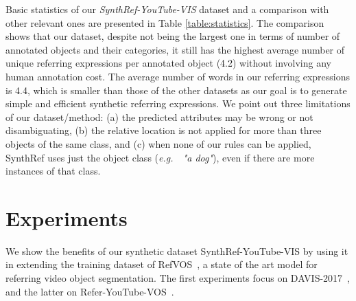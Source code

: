 \documentclass[11pt]{article}
\newcommand{\eg}{\textit{e.g.~}}
\begin{document}
Basic statistics of our \textit{SynthRef-YouTube-VIS} dataset and a comparison with other relevant ones are presented in Table \ref{table:statistics}. 
The comparison shows that our dataset, despite not being the largest one in terms of number of annotated objects and their categories, it still has the highest average number of unique referring expressions per annotated object (4.2) without involving any human annotation cost. The average number of words in our referring expressions is 4.4, which is smaller than 
those of the other datasets as our goal is to generate simple and efficient synthetic referring expressions.
We point out three limitations of our dataset/method: (a) the predicted attributes may be wrong or not disambiguating, (b) the relative location is not applied for more than three objects of the same class, and (c) when none of our rules can be applied, SynthRef uses just the object class (\eg ~\textit{"a dog"}), even if there are more instances of that class.
















 \section{Experiments}

\label{sec:experiments}



We show the benefits of our synthetic dataset SynthRef-YouTube-VIS by using it in extending the training dataset of RefVOS~\citep{bellver2020refvos}, a state of the art model for referring video object segmentation.
The first experiments focus on DAVIS-2017~\citep{Pont-Tuset_arXiv_2017}, and the latter on Refer-YouTube-VOS~\citep{seourvos}.
\end{document}
